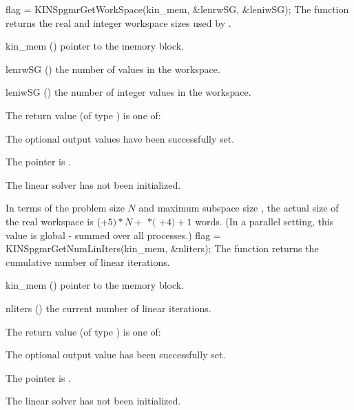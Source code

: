{
  flag = KINSpgmrGetWorkSpace(kin\_mem, \&lenrwSG, \&leniwSG);
}
{
  The function  returns the
  real and integer workspace sizes used by {\kinspgmr}.
}
{
  \begin{args}
  \item[kin\_mem] ()
    pointer to the {\kinsol} memory block.
  \item[lenrwSG] ()
    the number of  values in the {\kinspgmr} workspace.
  \item[leniwSG] ()
    the number of integer values in the {\kinspgmr} workspace.
  \end{args}
}
{
  The return value  (of type ) is one of:
  \begin{args}
  \item[\Id{KINSPGMR\_SUCCESS}] 
    The optional output values have been successfully set.
  \item[\Id{KINSPGMR\_MEM\_NULL}]
    The  pointer is .
  \item[\Id{KINSPGMR\_LMEM\_NULL}]
    The {\kinspgmr} linear solver has not been initialized.
  \end{args}
}
{
  In terms of the problem size $N$ and maximum subspace size , 
  the actual size of the real workspace is
  ($+ 5)*N +$  $*($ $ + 4) + 1$ 
  words.  (In a parallel setting, this value is global - summed over
  all processes.)
}
{
  flag = KINSpgmrGetNumLinIters(kin\_mem, \&nliters);
}
{
  The function  returns the
  cumulative number of linear iterations.
}
{
  \begin{args}
  \item[kin\_mem] ()
    pointer to the {\kinsol} memory block.
  \item[nliters] ()
    the current number of linear iterations.
  \end{args}
}
{
  The return value  (of type ) is one of:
  \begin{args}
  \item[\Id{KINSPGMR\_SUCCESS}] 
    The optional output value has been successfully set.
  \item[\Id{KINSPGMR\_MEM\_NULL}]
    The  pointer is .
  \item[\Id{KINSPGMR\_LMEM\_NULL}]
    The {\kinspgmr} linear solver has not been initialized.
  \end{args}
}
